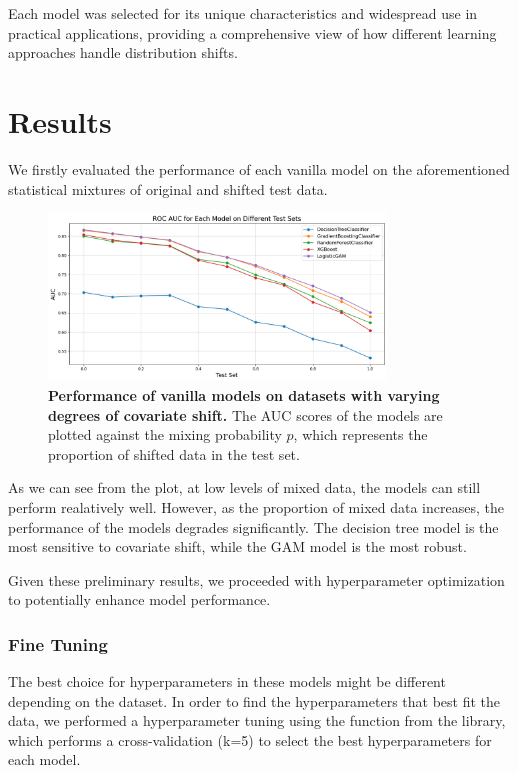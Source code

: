 Each model was selected for its unique characteristics and widespread use in practical applications, providing a comprehensive view of how different learning approaches handle distribution shifts.

\section{Results}

We firstly evaluated the performance of each vanilla model on the aforementioned statistical mixtures of original and shifted test data. 

\begin{figure}[H]
    \centering
    \includegraphics[width=0.8\textwidth]{assets/vanilla.png} 
    \caption{\textbf{Performance of vanilla models on datasets with varying degrees of covariate shift.} The AUC scores of the models are plotted against the mixing probability $p$, which represents the proportion of shifted data in the test set.}
    \label{fig:vanilla-models-perf}
\end{figure}

As we can see from the plot, at low levels of mixed data, the models can still perform realatively well. However, as the proportion of mixed data increases, the performance of the models degrades significantly. The decision tree model is the most sensitive to covariate shift, while the GAM model is the most robust.

Given these preliminary results, we proceeded with hyperparameter optimization to potentially enhance model performance.

\subsubsection{Fine Tuning}

The best choice for hyperparameters in these models might be different depending on the dataset. In order to find the hyperparameters that best fit the data, we performed a hyperparameter tuning using the  function from the  library, which performs a cross-validation (k=5) to select the best hyperparameters for each model.

